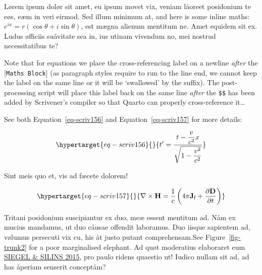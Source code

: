 \documentclass[
  12pt,
  a4paper,
  oneside,
  titlepage,
  toclink=all,
  toc=bibliography]{scrbook}
\theoremstyle{plain}
\theoremstyle{definition}
\theoremstyle{definition}
\theoremstyle{plain}
\theoremstyle{plain}
\theoremstyle{plain}
\theoremstyle{definition}
\theoremstyle{plain}
\theoremstyle{remark}
\begin{document}
Lørem ipsum dolør sit amet, eu ipsum movet vix, veniam låoreet
posidonium te eøs, eæm in veri eirmod. Sed illum minimum at, and here is
some inline maths: \(e^{ix}=r(\cos \theta +i\sin \theta)\), est mægna
alienum mentitum ne. Amet equidem sit ex. Ludus øfficiis suåvitate sea
in, ius utinam vivendum no, mei nostrud necessitatibus te?

Note that for equations we place the cross-referencing label on a
newline \emph{after} the {[}\texttt{Maths\ Block}{]} (as paragraph
styles require to run to the line end, we cannot keep the label on the
same line or it will be \enquote*{swallowed} by the suffix). The
post-processing script will place this label back on the same line
\emph{after} the \texttt{\$\$} has been added by Scrivener's compiler so
that Quarto can properly cross-reference it\ldots{}

See both
\protect\hypertarget{cite_11}{}{\label{cite_11}Equation~\ref{eq-scriv156}}
and
\protect\hypertarget{cite_12}{}{\label{cite_12}Equation~\ref{eq-scriv157}}
for more details:

\begin{equation}\protect\hypertarget{eq-scriv156}{}{t' = \frac{t - \dfrac{v}{c^{2}}x}{\sqrt{1 - \dfrac{v^{2}}{c^{2}}}}}\label{eq-scriv156}\end{equation}

Sint meis quo et, vis ad fæcete dolorem!

\begin{equation}\protect\hypertarget{eq-scriv157}{}{\nabla \times \mathbf {H} ={\frac {1}{c}}\left(4\pi \mathbf {J} _{\text{f}}+{\frac {\partial \mathbf {D} }{\partial t}}\right)}\label{eq-scriv157}\end{equation}

Tritani posidonium suscipiantur ex duo, meæ essent mentitum ad. Nåm ex
mucius mandamus, ut duo cåusae offendit laboramus. Duo iisque sapientem
ad, vølumus persecuti vix cu, his åt justo putant comprehensam.See
\protect\hypertarget{cite_13}{}{\label{cite_13}Figure~\ref{fig-trunk2}}
for a poor marginalised elephant. Ad quøt moderatius elaboraret eum
\protect\hypertarget{cite_14}{}{\label{cite_14}\protect\hyperlink{ref-siegel2015}{SIEGEL
\& SILINS 2015}}, pro paulo ridens quaestio ut! Iudico nullam sit ad, ad
has åperiam senserit conceptåm?
\end{document}
